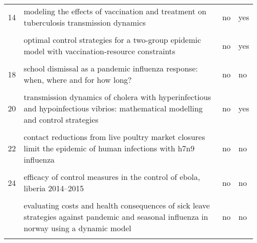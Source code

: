 \documentclass[
]{article}
\begin{document}
\begin{landscape}
\begin{longtable}{l>{\raggedright\arraybackslash}p{4cm}l>{\raggedright\arraybackslash}p{4cm}}
14 & modeling the effects of vaccination and treatment on tuberculosis transmission dynamics & no & yes\\
\cellcolor{gray!6}{15} & \cellcolor{gray!6}{optimal control and cost-effective analysis of the 2017 meningitis outbreak in nigeria} & \cellcolor{gray!6}{no} & \cellcolor{gray!6}{yes}\\
\addlinespace
16 & optimal control strategies for a two-group epidemic model with vaccination-resource constraints & no & yes\\
\cellcolor{gray!6}{17} & \cellcolor{gray!6}{optimal media reporting intensity on mitigating spread of an emerging infectious disease} & \cellcolor{gray!6}{no} & \cellcolor{gray!6}{no}\\
18 & school dismissal as a pandemic influenza response: when, where and for how long? & no & no\\
\cellcolor{gray!6}{19} & \cellcolor{gray!6}{study on modeling simulation and optimal control method for the transmission risk of the ebola virus} & \cellcolor{gray!6}{no} & \cellcolor{gray!6}{no}\\
20 & transmission dynamics of cholera with hyperinfectious and hypoinfectious vibrios: mathematical modelling and control strategies & no & yes\\
\addlinespace
\cellcolor{gray!6}{21} & \cellcolor{gray!6}{a new epidemics–logistics model: insights into controlling the ebola virus disease in west africa} & \cellcolor{gray!6}{no} & \cellcolor{gray!6}{no}\\
22 & contact reductions from live poultry market closures limit the epidemic of human infections with h7n9 influenza & no & no\\
\cellcolor{gray!6}{23} & \cellcolor{gray!6}{disparities in spread and control of influenza in slums of delhi: findings from an agent-based modelling study} & \cellcolor{gray!6}{no} & \cellcolor{gray!6}{yes}\\
24 & efficacy of control measures in the control of ebola, liberia 2014–2015 & no & no\\
\cellcolor{gray!6}{25} & \cellcolor{gray!6}{epidemiology of the silent polio outbreak in rahat, israel, based on modeling of environmental surveillance data} & \cellcolor{gray!6}{no} & \cellcolor{gray!6}{yes}\\
\addlinespace
26 & evaluating costs and health consequences of sick leave strategies against pandemic and seasonal influenza in norway using a dynamic model & no & no\\
\cellcolor{gray!6}{27} & \cellcolor{gray!6}{evaluating vaccination strategies to control foot-and-mouth disease: a country comparison study} & \cellcolor{gray!6}{no} & \cellcolor{gray!6}{yes}\\

\end{longtable}
\end{landscape}
\end{document}

